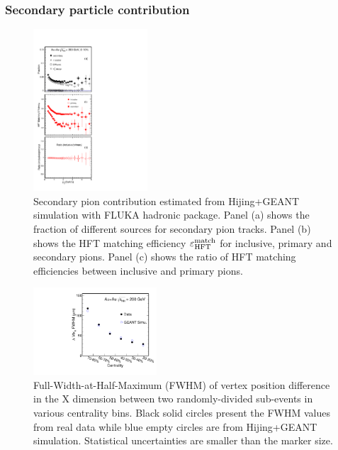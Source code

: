 \documentclass[%
 reprint,	
 amsmath,amssymb,
 aps,
 prc,
]{revtex4-1}
\begin{document}
\subsubsection{Secondary particle contribution}
\label{correction:hft:secondary}

\begin{figure}[h]
\centering
\includegraphics[width=0.38\textwidth, angle = 0]{fig/Fraction_Pion_2.pdf}
  \caption{Secondary pion contribution estimated from Hijing+GEANT simulation with FLUKA hadronic package. Panel (a) shows the fraction of different sources for secondary pion tracks. Panel (b) shows the HFT matching efficiency $\varepsilon_{\rm HFT}^{\rm match}$ for inclusive, primary and secondary pions. Panel (c) shows the ratio of HFT matching efficiencies between inclusive and primary pions.}
\label{fig:Fraction_Pion} 
\end{figure}

\begin{figure}
\centering
\includegraphics[width=0.41\textwidth]{fig/vtxX_vsCent.pdf}
\caption{Full-Width-at-Half-Maximum (FWHM) of vertex position difference in the X dimension between two randomly-divided sub-events in various centrality bins. Black solid circles present the FWHM values from real data while blue empty circles are from Hijing+GEANT simulation. Statistical uncertainties are smaller than the marker size.}
\label{fig:vtxX_vsCent} 
\end{figure}
\end{document}
